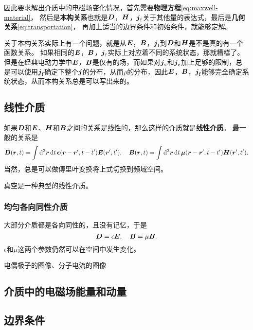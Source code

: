 \documentclass[UTF8, a4paper]{ctexart}
\renewcommand{\emph}[1]{\textbf{#1}}
\newcommand*{\concept}[1]{\underline{\textbf{#1}}}
\begin{document}
因此要求解出介质中的电磁场变化情况，首先需要\emph{物理方程}\eqref{eq:maxwell-material}，
然后是\emph{本构关系}也就是$\vb*{D}$，$\vb*{H}$，$\vb*{j}_\text{f}$关于其他量的表达式，最后是\emph{几何关系}\eqref{eq:transportation}，
再加上适当的边界条件和初始条件，就能够定解。

关于本构关系实际上有一个问题，就是从$\vb*{E}$，$\vb*{B}$，$\vb*{j}_\text{f}$到$\vb*{D}$和$\vb*{H}$是不是真的有一个函数关系。
如果相同的$\vb*{E}$，$\vb*{B}$，$\vb*{j}_\text{f}$实际上对应着不同的系统状态，那就糟糕了。
但是在经典电动力学中$\vb*{E}$，$\vb*{B}$是仅有的场，而如果对$\vb*{j}_\text{s}$和$\vb*{j}_\text{c}$加上足够的限制，总是可以使用$\vb*{j}_\text{f}$确定下整个$\vb*{j}$的分布，从而$\rho$的分布，因此$\vb*{E}$，$\vb*{B}$，$\vb*{j}_\text{f}$能够完全确定系统状态，从而本构关系总是可以写出来的。

\subsection{线性介质}

如果$\vb*{D}$和$\vb*{E}$、$\vb*{H}$和$\vb*{B}$之间的关系是线性的，那么这样的介质就是\concept{线性介质}。
最一般的关系是
\begin{equation}
    \vb*{D}(\vb*{r}, t) = \int \dd[3]{\vb*{r}} \dd{t} \vb*{\epsilon}(\vb*{r} - \vb*{r}', t - t') \vb*{E}(\vb*{r}', t'), \quad
    \vb*{B}(\vb*{r}, t) = \int \dd[3]{\vb*{r}} \dd{t} \vb*{\mu}(\vb*{r} - \vb*{r}', t - t') \vb*{H}(\vb*{r}', t').
\end{equation}
当然，总是可以做傅里叶变换将上式切换到频域空间。

真空是一种典型的线性介质。

\subsubsection{均匀各向同性介质}

大部分介质都是各向同性的，且没有记忆，于是
\begin{equation}
    \vb*{D} = \epsilon \vb*{E}, \quad \vb*{B} = \mu \vb*{B}.
\end{equation}
$\epsilon$和$\mu$这两个参数仍然可以在空间中发生变化。

电偶极子的图像、分子电流的图像

\subsection{介质中的电磁场能量和动量}

\subsection{边界条件}
\end{document}
